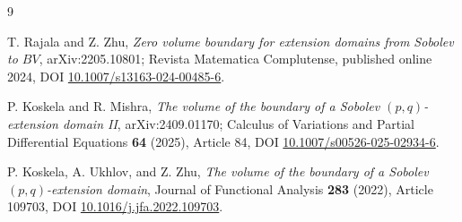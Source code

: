 \documentclass[11pt]{article}
\begin{document}
\begin{thebibliography}{9}

T. Rajala and Z. Zhu,
\emph{Zero volume boundary for extension domains from Sobolev to \(BV\)},
arXiv:2205.10801; Revista Matematica Complutense, published online 2024,
DOI \href{https://doi.org/10.1007/s13163-024-00485-6}{10.1007/s13163-024-00485-6}.

P. Koskela and R. Mishra,
\emph{The volume of the boundary of a Sobolev \((p,q)\)-extension domain II},
arXiv:2409.01170; Calculus of Variations and Partial Differential Equations
\textbf{64} (2025), Article 84,
DOI \href{https://doi.org/10.1007/s00526-025-02934-6}{10.1007/s00526-025-02934-6}.

P. Koskela, A. Ukhlov, and Z. Zhu,
\emph{The volume of the boundary of a Sobolev \((p,q)\)-extension domain},
Journal of Functional Analysis \textbf{283} (2022), Article 109703,
DOI \href{https://doi.org/10.1016/j.jfa.2022.109703}{10.1016/j.jfa.2022.109703}.

\end{thebibliography}
\end{document}
